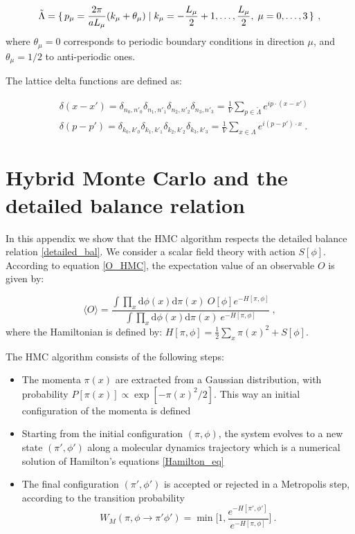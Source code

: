 \begin{equation}
\tilde\Lambda = \set{p_{\mu} = \frac{2 \pi}{a L_{\mu}}(k_{\mu} + \theta_{\mu})  \mid  k_{\mu} = -\frac{L_{\mu}}{2} + 1, \dots, \frac{L_{\mu}}{2}, \; \mu = 0, \dots, 3 } \: ,
\end{equation}
%
where $\theta_{\mu} = 0$ corresponds to periodic boundary conditions in direction $\mu$, and $\theta_{\mu} = 1/2$ to anti-periodic ones.

The lattice delta functions are defined as:

\begin{equation}
\begin{split}
& \delta(x-x') =  \delta_{n_0,n'_0} \delta_{n_1,n'_1} \delta_{n_2,n'_2} \delta_{n_3,n'_3} = \frac{1}{V} \sum_{p \in \tilde\Lambda}
e^{i p \cdot (x - x')} \\
& \delta(p-p') =  \delta_{k_0,k'_0}\delta_{k_1,k'_1} \delta_{k_2,k'_2} \delta_{k_3,k'_3} = \frac{1}{V} \sum_{x \in \Lambda} 
e^{i (p - p') \cdot x } \: .
\end{split}
\end{equation}

\section{Hybrid Monte Carlo and the detailed balance relation}
\label{HMC_db}

In this appendix we show that the HMC algorithm respects the detailed balance relation \ref{detailed_bal}. We consider a scalar field theory with action $S[\phi]$. According to equation \ref{O_HMC}, the expectation value of an observable $O$ is given by:

\begin{equation}
\langle O \rangle = \frac{\int \prod_{x} \mathrm{d} \phi(x) \mathrm{d} \pi(x) \: O[\phi] e^{-H[\pi,\phi] }}{\int \prod_{x} \mathrm{d} \phi(x) \mathrm{d} \pi(x) \: e^{-H[\pi,\phi]}} \: ,
\end{equation}
%
where the Hamiltonian is defined by: $H[\pi,\phi] =  \frac{1}{2} \sum_x \pi(x)^2 + S[\phi]$.

 The HMC algorithm consists of the following steps:

\begin{itemize}
\item The momenta $\pi(x)$ are extracted from a Gaussian distribution, with probability $P[\pi(x)] \propto \exp[-\pi(x)^2/2]$. This way an initial configuration of the momenta is defined
\item Starting from the initial configuration $(\pi, \phi)$, the system evolves to a new state $(\pi',\phi')$ along a molecular dynamics trajectory which is a numerical solution of Hamilton's equations \ref{Hamilton_eq}
\item The final configuration $(\pi',\phi')$ is accepted or rejected in a Metropolis step, according to the transition probability 
\begin{equation}
W_M(\pi, \phi \to \pi' \phi') = \min \biggl[ 1, \frac{e^{-H[\pi',\phi']}}{e^{-H[\pi,\phi]}} \biggr] \: .
\end{equation}
\end{itemize}


